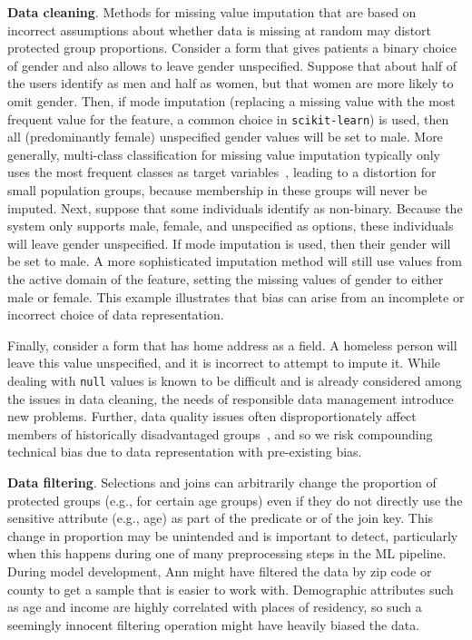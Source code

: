 \documentclass[11pt]{article}
\newcommand*{\eg}{e.g.,\xspace}
\newcommand{\sklearn}{\stt{scikit-learn}\xspace}
\newcommand{\header}[1]{\vspace{1mm}\noindent\textbf{#1}.}
\newcommand{\stt}[1]{{\footnotesize\texttt{#1}}}
\begin{document}
\header{Data cleaning}
Methods for missing value imputation that are based on incorrect assumptions about whether data is missing at random may distort protected group proportions. Consider a form that gives patients a binary choice of gender and also allows to leave gender unspecified. Suppose that about half of the users identify as men and half as women, but that women are more likely to omit gender.  Then, if mode imputation (replacing a missing value with the most frequent value for the feature, a common choice in \sklearn) is used, then all (predominantly female) unspecified gender values will be set to male.  More generally, multi-class classification for missing value imputation typically only uses the most frequent classes as target variables~\cite{Biessmann2018}, leading to a distortion for small population groups, because membership in these groups will never be imputed. Next, suppose that some individuals identify as non-binary.  Because the system only supports male, female, and unspecified as options, these individuals will leave gender unspecified.  If mode imputation is used, then their gender will be set to male.  A more sophisticated imputation method will still use values from the active domain of the feature, setting the missing values of gender to either male or female.  This example illustrates that  bias can arise from an incomplete or incorrect choice of data representation.
 
Finally, consider a form that has home address as a field.  A homeless person will leave this value unspecified, and it is incorrect to attempt to impute it. While dealing with \stt{null} values is known to be difficult and is already considered among the issues in data cleaning, the needs of responsible data management introduce new problems. Further, data quality issues often disproportionately affect members of historically disadvantaged groups~\cite{kappelhof2017}, and so we risk compounding technical bias due to data representation with pre-existing bias. 

\header{Data filtering} Selections and joins can arbitrarily change the proportion of protected groups (\eg for certain age groups) even if they do not directly use the sensitive attribute (\eg age) as part of the predicate or of the join key.  This change in proportion may be unintended and is important to detect, particularly when this happens during one of many preprocessing steps in the ML pipeline. During model development, Ann might have filtered the data by zip code or county to get a sample that is easier to work with. Demographic attributes such as age and income are highly correlated with places of residency, so such a seemingly innocent filtering operation might have heavily biased the data.
\end{document}
